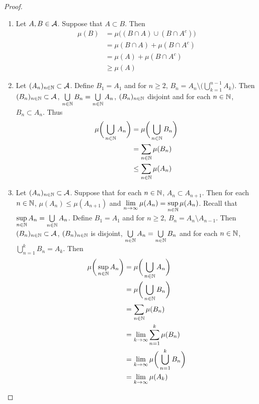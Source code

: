 \documentclass{book}
\begin{document}
	\begin{proof}\
		\begin{enumerate}
			\item Let $A, B \in \mathcal{A}$. Suppose that $A \subset B$. Then 
			\begin{align*}
				\mu(B) 
				&= \mu\bigg((B \cap A) \cup (B \cap A^c)\bigg)\\
				&= \mu(B \cap A) + \mu(B \cap A^c)\\
				&= \mu(A) + \mu(B \cap A^c)\\
				&\geq \mu(A)
			\end{align*}
			\item Let $(A_n)_{n \in \mathbb{N}} \subset \mathcal{A}$. Define $B_1 = A_1$ and for $n \geq 2$, $B_n = A_n \setminus \bigg( \bigcup\limits_{k=1}^{n-1}A_k \bigg)$. Then $(B_n)_{n \in \mathbb{N}} \subset \mathcal{A}$, $\bigcup\limits_{n \in \mathbb{N}}B_n = \bigcup\limits_{n \in \mathbb{N}}A_n $, $(B_n)_{n \in \mathbb{N}}$ disjoint and for each $n \in \mathbb{N}$, $B_n \subset A_n$. Thus 
			\begin{align*}
				\mu\bigg(\bigcup_{n \in \mathbb{N}}A_n \bigg)
				&= \mu\bigg(\bigcup_{n \in \mathbb{N}}B_n \bigg)\\
				&= \sum\limits_{n \in \mathbb{N}}\mu(B_n) \\
				&\leq \sum\limits_{n \in \mathbb{N}}\mu(A_n)
			\end{align*} 
			\item Let $(A_n)_{n \in \mathbb{N}} \subset \mathcal{A}$. Suppose that for each $n \in \mathbb{N}$, $A_n \subset A_{n+1}$. Then for each $n \in \mathbb{N}$, $\mu(A_n) \leq \mu(A_{n+1})$ and $\lim\limits_{n \rightarrow \infty}\mu(A_n) = \sup\limits_{n \in \mathbb{N}} \mu(A_n)$. Recall that $\sup\limits_{n \in \mathbb{N}}A_n = \bigcup\limits_{n \in \mathbb{N}}A_n$. 
			Define $B_1 = A_1$ and for $n \geq 2$, $B_n = A_n \setminus A_{n-1}$. Then $(B_n)_{n \in \mathbb{N}} \subset \mathcal{A}$, $(B_n)_{n \in \mathbb{N}}$ is disjoint, $\bigcup\limits_{n \in \mathbb{N}}A_n = \bigcup\limits_{n \in \mathbb{N}}B_n$ and for each $n \in \mathbb{N}$, $\bigcup\limits_{n=1}^{k}B_n = A_k$. Then 
			\begin{align*}
				\mu\bigg(\sup\limits_{n \in \N}A_n \bigg)
				&= \mu\bigg(\bigcup_{n \in \N}A_n \bigg) \\
				&= \mu\bigg(\bigcup\limits_{n \in \N}B_n \bigg)\\
				&= \sum\limits_{n \in \N} \mu(B_n) \\
				&= \lim_{k \rightarrow \infty} \sum\limits_{n=1}^k \mu(B_n) \\
				&= \lim_{k \rightarrow \infty} \mu \bigg(\bigcup_{n=1}^k B_n \bigg) \\
				&= \lim_{k \rightarrow \infty} \mu(A_k) \\

\end{align*}
\end{enumerate}
\end{proof}
\end{document}
